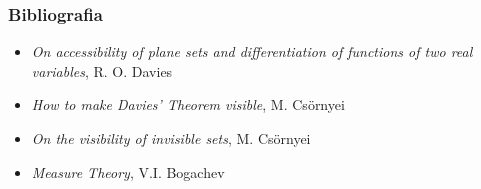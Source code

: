 \documentclass[11pt]{beamer} %
\newcommand{\<}{\langle}
\renewcommand{\>}{\rangle}
\theoremstyle{theorem}
\theoremstyle{theorem}
\theoremstyle{theorem}
\theoremstyle{theorem}
\theoremstyle{theorem}
\begin{document}
\begin{frame}
	\frametitle{Bibliografia}
	
	\begin{itemize}
		\item \emph{On accessibility of plane sets and differentiation
			of functions of two real variables}, R. O. Davies
		\item \emph{How to make Davies' Theorem visible}, M. Cs{\"o}rnyei
		\item \emph{On the visibility of invisible sets}, M. Cs{\"o}rnyei
		\item \emph{Measure Theory}, V.I. Bogachev\\
		\end{itemize}	
	
	\medskip
	\begin{center}
	\end{center}
\end{frame}
\end{document}
